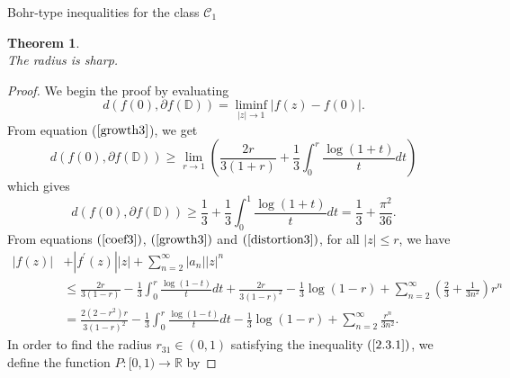 \documentclass[12pt,a4paper,reqno]{amsart}
\theoremstyle{definition}
\theoremstyle{plain}
\newtheorem{theorem}[definition]{Theorem}
\numberwithin{equation}{section}
\begin{document}
\begin{section}{Bohr-type inequalities for the class $\mathcal{C}_1$}
\begin{theorem}
\begin{equation*}
\end{equation*}
The radius is sharp.
\end{theorem}
\begin{proof}
We begin the proof by evaluating
\begin{equation*}
d(f(0), \partial{f(\mathbb{D})})= \liminf \limits_{|z| \rightarrow 1} |f(z)-f(0)|.
\end{equation*}
From equation ($\ref{growth3}$), we get
\begin{equation*}
d(f(0), \partial{f(\mathbb{D})}) \ge \lim \limits_{r \rightarrow 1} \left(\frac{2r}{3(1+r)}+\frac{1}{3} \int_{0}^{r} \frac{\log(1+t)}{t} dt \right)
\end{equation*}
which gives
\begin{equation}\label{eq16}
d(f(0), \partial{f(\mathbb{D})}) \ge \frac{1}{3} +\frac{1}{3} \int_{0}^{1} \frac{\log(1+t)}{t} dt=\frac{1}{3}+\frac{\pi ^2}{36}.
\end{equation}
From  equations $(\ref{coef3})$, $(\ref{growth3})$ and $(\ref{distortion3})$, for all $|z| \le r$, we have
\begin{align}\label{eq17}
|f(z)|& + |f^{'}(z)||z| + \sum_{n=2}^{\infty} |a_n| |z|^n\\
&\le \frac{2r}{3(1-r)}-\frac{1}{3} \int_{0}^{r} \frac{\log(1-t)}{t} dt+ \frac{2r}{3(1-r)^2}-\frac{1}{3} \log(1-r)+ \sum_{n=2}^{\infty} \left( \frac{2}{3} + \frac{1}{3 n^2} \right)  r^n\nonumber\\
&=\frac{2 (2-r^2) r}{3 (1-r)^2}-\frac{1}{3} \int_{0}^{r} \frac{\log(1-t)}{t} dt-\frac{1}{3} \log(1-r)+ \sum_{n=2}^{\infty} \frac{r^n}{3 n^2}.
\end{align}
In order to find the radius $r_{31}\in (0, 1)$ satisfying the inequality $(\ref{2.3.1})$, we define the function $P:[0, 1)\rightarrow\mathbb{R}$ by


\end{proof}
\end{section}
\end{document}
